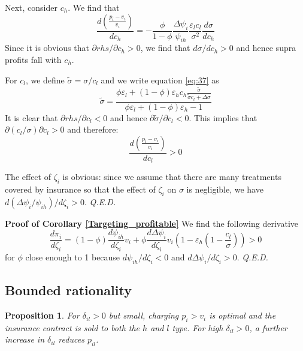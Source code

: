 \documentclass[a4paper,12pt]{article}
\newtheorem{proposition}{Proposition}
\newcommand{\qed}{\hspace*{\fill} {\em Q.E.D.}}
\begin{document}
Next, consider \(c_h\). We find that
\begin{equation}
\label{eq:57}
\frac{d\left(\frac{p_i-v_i}{v_i} \right)}{d c_h} = - \frac{\phi}{1-\phi} \frac{\Delta \psi_i}{\psi_{ih}} \frac{\varepsilon_l c_l}{\sigma^2} \frac{d\sigma}{d c_h}
\end{equation}
Since it is obvious that \(\partial rhs/\partial c_h >0\), we find that \(d\sigma/dc_h>0\) and hence supra profits fall with \(c_h\).

For \(c_l\), we define \(\tilde \sigma = \sigma/c_l\) and we write equation \eqref{eq:37} as
\begin{equation}
\label{eq:64}
\tilde \sigma = \frac{\phi \varepsilon_l +(1-\phi) \varepsilon_h c_h \frac{\tilde \sigma}{\tilde \sigma c_l + \Delta \sigma} }{\phi \varepsilon_l +(1-\phi) \varepsilon_h-1}
\end{equation}
It is clear that \(\partial rhs/\partial c_l <0\) and hence \(\partial \tilde \sigma /\partial c_l <0\). This implies that \(\partial (c_l/\sigma)\partial c_l > 0\) and therefore:
\begin{equation}
\label{eq:65}
\frac{d\left(\frac{p_i-v_i}{v_i} \right)}{dc_l} >0
\end{equation}

The effect of \(\zeta_i\) is obvious: since we assume that there are many treatments covered by insurance so that the effect of \(\zeta_i\) on \(\sigma\) is negligible, we have \(d(\Delta\psi_i/\psi_{ih})/d\zeta_i>0\). 
 \qed

\textbf{Proof of Corollary \ref{Targeting_profitable}}
We find the following derivative
\begin{equation}
\label{eq:66}
\frac{d \pi_i}{d \zeta_i} = (1-\phi) \frac{d \psi_{ih}}{d\zeta_i} v_i+\phi \frac{d\Delta\psi_i}{d\zeta_i}v_i (1-\varepsilon_h(1-\frac{c_l}{\sigma})) > 0
\end{equation}
for \(\phi\) close enough to 1 because \(d\psi_{ih}/d\zeta_{i}<0\) and \(d\Delta\psi_i/d\zeta_i>0\). 
 \qed

\subsection{Bounded rationality}
\label{sec:org54662df}

\begin{proposition}
\label{propBounded}
For \(\delta_{il} > 0\) but small, charging \(p_i>v_i\) is optimal and the insurance contract is sold to both the \(h\) and \(l\) type.
For high \(\delta_{il}>0\), a further increase in \(\delta_{il}\) reduces \(p_{il}\).
\end{proposition}
\end{document}
